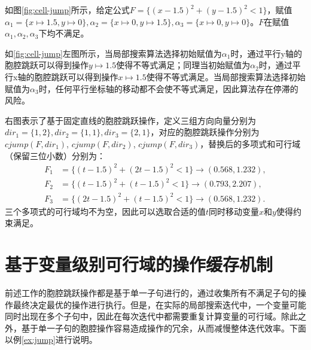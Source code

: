 \begin{example}
如图\ref{fig:cell-jump}所示，给定公式$F = \{(x - 1.5)^2 + (y - 1.5)^2 < 1\}$，赋值$\alpha_1 = \{x \mapsto 1.5, y \mapsto 0\}, \alpha_2 = \{x \mapsto 0, y \mapsto 1.5\}, \alpha_3 = \{x \mapsto 0, y \mapsto 0\}$。$F$在赋值$\alpha_1, \alpha_2, \alpha_3$下均不满足。

如\ref{fig:cell-jump}左图所示，当局部搜索算法选择初始赋值为$\alpha_1$时，通过平行y轴的胞腔跳跃可以得到操作$y \mapsto 1.5$使得不等式满足；同理当初始赋值为$\alpha_2$时，通过平行x轴的胞腔跳跃可以得到操作$x \mapsto 1.5$使得不等式满足。当局部搜索算法选择初始赋值为$\alpha_3$时，任何平行坐标轴的移动都不会使不等式满足，因此算法存在停滞的风险。

右图表示了基于固定直线的胞腔跳跃操作，定义三组方向向量分别为$dir_1 = \{1, 2\}, dir_2 = \{1, 1\}, dir_3 = \{2, 1\}$，对应的胞腔跳跃操作分别为$cjump(F, dir_1)$, $cjump(F, dir_2)$, $cjump(F, dir_3)$，替换后的多项式和可行域（保留三位小数）分别为：
\begin{align*}
    F_1 &= \{(t - 1.5)^2 + (2t - 1.5)^2 < 1\} \rightarrow (0.568, 1.232), \\
    F_2 &= \{(t - 1.5)^2 + (t - 1.5)^2 < 1\} \rightarrow (0.793, 2.207), \\
    F_3 &= \{(2t - 1.5)^2 + (t - 1.5)^2 < 1\} \rightarrow (0.568, 1.232).
\end{align*}
三个多项式的可行域均不为空，因此可以选取合适的值$t$同时移动变量$x$和$y$使得约束满足。
\end{example}

\section{基于变量级别可行域的操作缓存机制}
前述工作的胞腔跳跃操作都是基于单一子句进行的，通过收集所有不满足子句的操作最终决定最优的操作进行执行。但是，在实际的局部搜索迭代中，一个变量可能同时出现在多个子句中，因此在每次迭代中都需要重复计算变量的可行域。除此之外，基于单一子句的胞腔操作容易造成操作的冗余，从而减慢整体迭代效率。下面以例\ref{ex:jump}进行说明。

